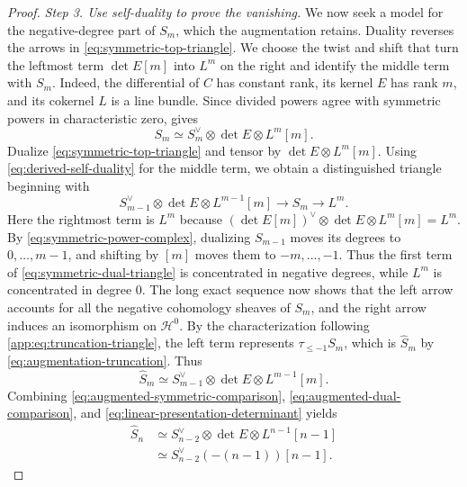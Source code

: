 \documentclass[12pt,reqno,a4paper]{amsart}
\numberwithin{equation}{section}
\numberwithin{figure}{section}
\theoremstyle{plain}
\theoremstyle{definition}
\begin{document}
\begin{proof}
\smallskip
\noindent\textit{Step 3. Use self-duality to prove the vanishing.}
We now seek a model for the negative-degree part of $S_m$, which
the augmentation retains. Duality reverses the arrows in
\eqref{eq:symmetric-top-triangle}. We choose the twist and shift
that turn the leftmost term $\det E[m]$ into $L^m$ on the right
and identify the middle term with $S_m$.
Indeed, the differential of $C$ has constant rank, its kernel $E$
has rank $m$, and its cokernel $L$ is a line bundle. Since divided
powers agree with symmetric powers in characteristic zero,
\cite[Theorem~3.2]{RSWY} gives
\begin{equation}\label{eq:derived-self-duality}
 S_m\simeq S_m^\vee\otimes\det E\otimes L^m[m].
\end{equation}
Dualize \eqref{eq:symmetric-top-triangle} and tensor by
$\det E\otimes L^m[m]$. Using \eqref{eq:derived-self-duality} for the
middle term, we obtain a distinguished triangle beginning with
\begin{equation}\label{eq:symmetric-dual-triangle}
 S_{m-1}^\vee\otimes\det E\otimes L^{m-1}[m]
 \longrightarrow S_m\longrightarrow L^m.
\end{equation}
Here the rightmost term is $L^m$ because
$(\det E[m])^\vee\otimes\det E\otimes L^m[m]=L^m$.
By \eqref{eq:symmetric-power-complex}, dualizing $S_{m-1}$ moves
its degrees to $0,\ldots,m-1$, and shifting by $[m]$ moves them
to $-m,\ldots,-1$. Thus the first term of
\eqref{eq:symmetric-dual-triangle} is concentrated in negative degrees,
while $L^m$ is concentrated in degree $0$.
The long exact sequence now shows that the left arrow accounts for
all the negative cohomology sheaves of $S_m$, and the right arrow
induces an isomorphism on $\mathcal H^0$. By the characterization
following \eqref{app:eq:truncation-triangle}, the left term represents
$\tau_{\leq-1}S_m$, which is $\widehat S_m$ by
\eqref{eq:augmentation-truncation}. Thus
\begin{equation}\label{eq:augmented-dual-comparison}
 \widehat S_m\simeq
 S_{m-1}^\vee\otimes\det E\otimes L^{m-1}[m].
\end{equation}
Combining \eqref{eq:augmented-symmetric-comparison},
\eqref{eq:augmented-dual-comparison}, and
\eqref{eq:linear-presentation-determinant} yields
\begin{equation}\label{eq:augmented-acyclic-model}
 \begin{aligned}
 \widehat S_n
 &\simeq S_{n-2}^\vee\otimes\det E\otimes L^{n-1}[n-1]\\
 &\simeq S_{n-2}^\vee(-(n-1))[n-1].
 \end{aligned}
\end{equation}


\end{proof}
\end{document}
